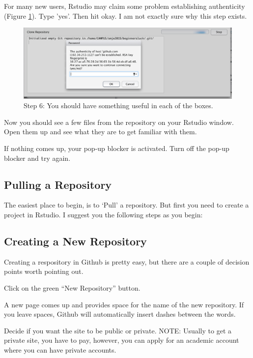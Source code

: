 \documentclass[12pt]{../SOP3_beta}
\begin{document}
\NP For many new users, Rstudio may claim some problem establishing authenticity (Figure \ref{fig:step6}). Type 'yes'. Then hit okay. I am not exactly sure why this step exists. 

\begin{figure}[H]
\includegraphics{graphics/Authenticity.jpg}
\caption{Step 6: You should have something useful in each of the boxes.}
\label{fig:step6}
\end{figure}


\NP Now you should see a few files from the repository on your Rstudio window. Open them up and see what they are to get familiar with them.

\NP If nothing comes up, your pop-up blocker is activated. Turn off the pop-up blocker and try again. 

\subsection{Pulling a Repository}

\NP The easiest place to begin, is to `Pull' a repository. But first you need to create a project in Rstudio. I suggest you the following steps as you begin:

\subsection{Creating a New Repository}

\NP Creating a respository in Github is pretty easy, but there are a couple of decision points worth pointing out.

\NP Click on the green ``New Repository'' button.

\NP A new page comes up and provides space for the name of the new repository. If you leave spaces, Github will automatically insert dashes between the words.

\NP Decide if you want the site to be public or private. NOTE: Usually to get a private site, you have to pay, however, you can apply for an academic account where you can have private accounts. 
\end{document}
